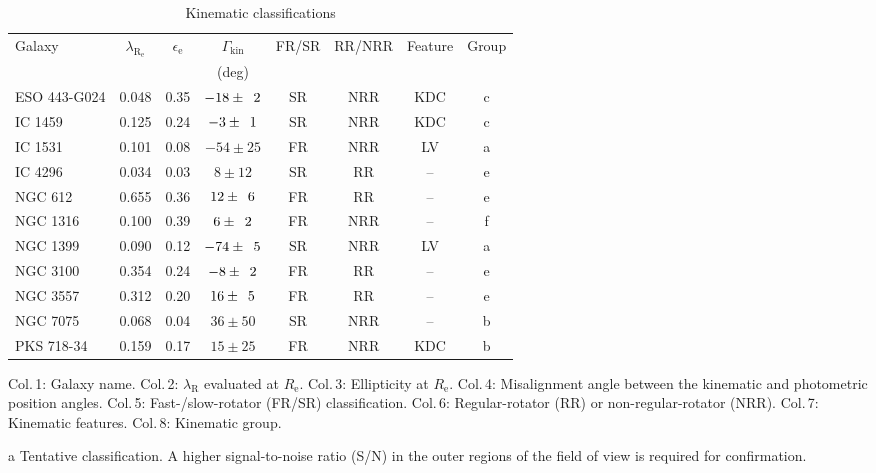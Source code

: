 \documentclass[fleqn,usenatbib,useAMS]{mnras}
\begin{document}
	\begin{table*}
		\centering
	\begin{threeparttable}
		\caption{Kinematic classifications}
		\label{tab:classify}
		\begin{tabular}{l c c c c c c c}
			\hline
			\hline
			Galaxy		& $\lambda_\mathrm{R_e}$ & $\epsilon_\mathrm{e}$  & $\Gamma_\text{kin}$ & FR/SR 	& RR/NRR 	& Feature & Group 	\\
			 & & & (deg) \\
			\hline 
			ESO 443-G024 & 0.048 & 0.35 & $-18\pm\leavevmode\phantom{0}2$	& SR & NRR & KDC & c \\
			IC 1459 	& 0.125 & 0.24 & \leavevmode\phantom{0}$-3\pm\leavevmode\phantom{0}1$ & SR & NRR & KDC & c \\
			IC 1531 	& 0.101 & 0.08 & $-54\pm25$	& FR & NRR & LV & a \\
			IC 4296		& 0.034 & 0.03 & \leavevmode\phantom{$-0$}$8\pm12$ & SR &\leavevmode\phantom{N}RR & -- & e \\
			NGC 612 	& 0.655 & 0.36 & \leavevmode\phantom{$-$}$12\pm\leavevmode\phantom{0}6$	& FR &\leavevmode\phantom{N}RR & -- & e \\
			NGC 1316 	& 0.100 & 0.39 & \leavevmode\phantom{$-0$}$6\pm\leavevmode\phantom{0}2$ & FR & NRR & -- & f \\
			NGC 1399 	& 0.090 & 0.12 & $-74\pm\leavevmode\phantom{0}5$ & SR & NRR & LV & a \\
			NGC 3100 	& 0.354 & 0.24 & \leavevmode\phantom{0}$-8\pm\leavevmode\phantom{0}2$ & FR &\leavevmode\phantom{N}RR & -- & e \\
			NGC 3557 	& 0.312 & 0.20 & \leavevmode\phantom{$-$}$16\pm\leavevmode\phantom{0}5$ & FR &\leavevmode\phantom{N}RR & -- & e\\
			NGC 7075 	& 0.068 & 0.04 & \leavevmode\phantom{$-$}$36\pm50$ & SR & NRR & -- & b \\
			PKS 718-34  & 0.159 & 0.17 & \leavevmode\phantom{$-$}$15\pm25$ & FR & NRR & KDC\tnote{a} & b\\
			\hline
			\hline
		\end{tabular}
		\begin{tablenotes}
		\footnotesize
		\note Col.\,1: Galaxy name. Col.\,2: $\lambda_\mathrm{R}$ evaluated at $R_\mathrm{e}$. Col.\,3: Ellipticity at $R_\mathrm{e}$. Col.\,4: Misalignment angle between the kinematic and photometric position angles. Col.\,5: Fast-/slow-rotator (FR/SR) classification. Col.\,6: Regular-rotator (RR) or non-regular-rotator (NRR). Col.\,7: Kinematic features. Col.\,8: Kinematic group.
		\item [a] Tentative classification. A higher signal-to-noise ratio (S/N) in the outer regions of the field of view is required for confirmation.
		\end{tablenotes}
	\end{threeparttable}
	\end{table*}
\end{document}

